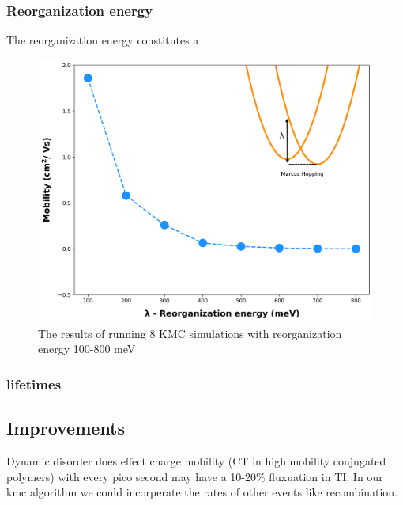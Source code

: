 \subsubsection{Reorganization energy}
The reorganization energy constitutes a 
\begin{figure}
  \center
  \includegraphics[width=\linewidth, height=\textheight,keepaspectratio]{figures/reorg.png} 
    \caption{The results of running 8 KMC simulations with reorganization energy 100-800 meV}
  \label{fig:reorg}
\end{figure}

\subsubsection{lifetimes}

\subsection{Improvements}
Dynamic disorder does effect charge mobility (CT in high mobility conjugated polymers) with every pico second
may have a 10-20\% fluxuation in TI. 
In our kmc algorithm we could incorperate the rates of other events like recombination.
